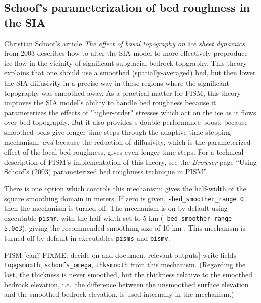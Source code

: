 \subsection{Schoof's parameterization of bed roughness in the SIA} \label{subsect:bedsmooth} 

Christian Schoof's article \emph{The effect of basal topography on ice sheet dynamics} from 2003 \cite{Schoofbasaltopg2003} describes how to alter the SIA model to more-effectively preproduce ice flow in the vicinity of significant subglacial bedrock topgraphy.  This theory explains that one should use a smoothed (spatially-averaged) bed, but then lower the SIA diffusivity in a precise way in those regions where the significant topography was smoothed-away.  As a practical matter for PISM, this theory improves the SIA model's ability to handle bed roughness because it parameterizes the effects of "higher-order" stresses which act on the ice as it flows over bed topography.   But it also provides s double performance boost, because smoothed beds give longer time steps through the adaptive time-stepping mechanism, \emph{and} because the reduction of diffusivity, which is the parameterized effect of the local bed roughness, gives even longer time-steps.  For a technical description of PISM's implementation of this theory, see the \emph{Browser} page ``Using Schoof's (2003) parameterized bed roughness technique in PISM''.

There is one option which controls this mechanism:  gives the half-width of the square smoothing domain in meters.  If zero is given, \texttt{-bed_smoother_range 0} then the mechanism is turned off.  The mechanism is on by default using executable \texttt{pismr}, with the half-width set to 5 km (\texttt{-bed_smoother_range 5.0e3}), giving the recommended smoothing size of 10 km \cite{Schoofbasaltopg2003}.  This mechanism is turned off by default in executables \texttt{pisms} and \texttt{pismv}.

PISM [can? FIXME: decide on and document relevant outputs] write fields \texttt{topgsmooth}, \texttt{schoofs_omega}, \texttt{thksmooth} from this mechanism.  (Regarding the last, the thickness is never smoothed, but the thickness relative to the smoothed bedrock elevation, i.e.~the difference between the unsmoothed surface elevation and the smoothed bedrock elevation, is used internally in the mechanism.)


